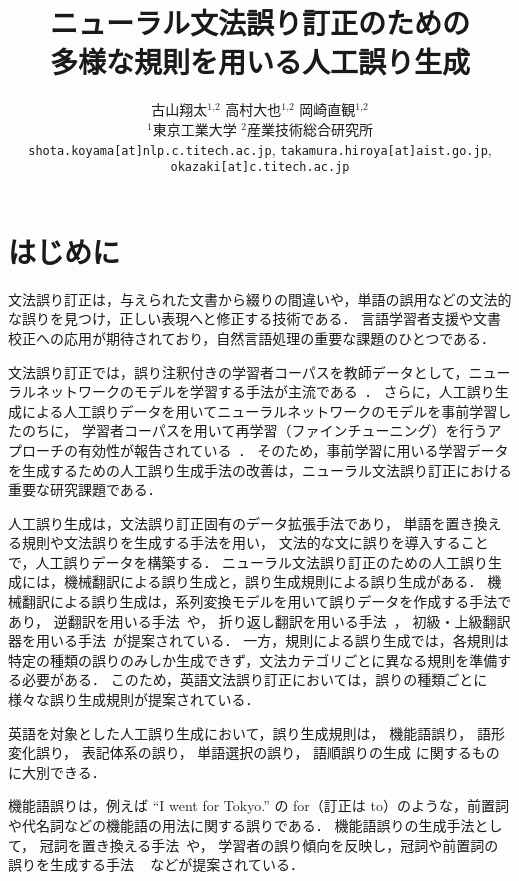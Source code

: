 \documentclass[
  platex, dvipdfmx %
]{nlp2021}
\title{ニューラル文法誤り訂正のための\\多様な規則を用いる人工誤り生成}
\author{%
	古山翔太${}^\textrm{1,2}$
	\hspace{2em}
	高村大也${}^\textrm{1,2}$
	\hspace{2em}
 	岡崎直観${}^\textrm{1,2}$
	\\
	${}^\textrm{1}$東京工業大学
	\hspace{2em}
	${}^\textrm{2}$産業技術総合研究所
	\\
	\texttt{shota.koyama[at]nlp.c.titech.ac.jp},
	\texttt{takamura.hiroya[at]aist.go.jp},\\
	\texttt{okazaki[at]c.titech.ac.jp}
}
\begin{document}
\maketitle

\section{はじめに}
文法誤り訂正は，与えられた文書から綴りの間違いや，単語の誤用などの文法的な誤りを見つけ，正しい表現へと修正する技術である．
言語学習者支援や文書校正への応用が期待されており，自然言語処理の重要な課題のひとつである．

文法誤り訂正では，誤り注釈付きの学習者コーパスを教師データとして，ニューラルネットワークのモデルを学習する手法が主流である~\cite{junczys-dowmunt-etal-2018-approaching}．
さらに，人工誤り生成による人工誤りデータを用いてニューラルネットワークのモデルを事前学習したのちに，
学習者コーパスを用いて再学習（ファインチューニング）を行うアプローチの有効性が報告されている~\cite{lichtarge-etal-2019-corpora}．
そのため，事前学習に用いる学習データを生成するための人工誤り生成手法の改善は，ニューラル文法誤り訂正における重要な研究課題である．

人工誤り生成は，文法誤り訂正固有のデータ拡張手法であり，
単語を置き換える規則や文法誤りを生成する手法を用い，
文法的な文に誤りを導入することで，人工誤りデータを構築する．
ニューラル文法誤り訂正のための人工誤り生成には，機械翻訳による誤り生成と，誤り生成規則による誤り生成がある．
機械翻訳による誤り生成は，系列変換モデルを用いて誤りデータを作成する手法であり，
逆翻訳を用いる手法~\cite{rei-etal-2017-artificial,ge-etal-2018-fluency,kiyono-etal-2019-empirical}や，
折り返し翻訳を用いる手法~\cite{lichtarge-etal-2019-corpora,lichtarge-etal-2020-data}，
初級・上級翻訳器を用いる手法~\cite{zhou-etal-2020-improving-grammatical}が提案されている．
一方，規則による誤り生成では，各規則は特定の種類の誤りのみしか生成できず，文法カテゴリごとに異なる規則を準備する必要がある．
このため，英語文法誤り訂正においては，誤りの種類ごとに様々な誤り生成規則が提案されている．

英語を対象とした人工誤り生成において，誤り生成規則は，
機能語誤り，
語形変化誤り，
表記体系の誤り，
単語選択の誤り，
語順誤りの生成
に関するものに大別できる．

機能語誤りは，例えば ``I went for Tokyo.'' の for（訂正は to）のような，前置詞や代名詞などの機能語の用法に関する誤りである．
機能語誤りの生成手法として，
冠詞を置き換える手法~\cite{izumi-etal-2003-automatic}や，
学習者の誤り傾向を反映し，冠詞や前置詞の誤りを生成する手法 ~\cite{rozovskaya-roth-2010-training,rozovskaya-roth-2010-generating} などが提案されている．
\end{document}
